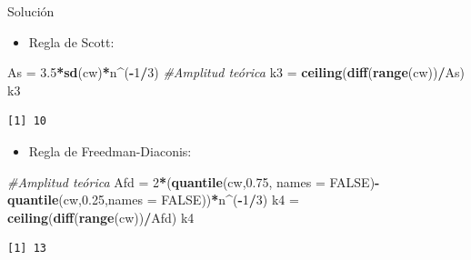 \documentclass[
  ignorenonframetext,
]{beamer}
\newenvironment{Shaded}{\begin{snugshade}}{\end{snugshade}}
\newcommand{\AttributeTok}[1]{\textcolor[rgb]{0.13,0.29,0.53}{#1}}
\newcommand{\CommentTok}[1]{\textcolor[rgb]{0.56,0.35,0.01}{\textit{#1}}}
\newcommand{\ConstantTok}[1]{\textcolor[rgb]{0.56,0.35,0.01}{#1}}
\newcommand{\DecValTok}[1]{\textcolor[rgb]{0.00,0.00,0.81}{#1}}
\newcommand{\FloatTok}[1]{\textcolor[rgb]{0.00,0.00,0.81}{#1}}
\newcommand{\FunctionTok}[1]{\textcolor[rgb]{0.13,0.29,0.53}{\textbf{#1}}}
\newcommand{\NormalTok}[1]{#1}
\newcommand{\OtherTok}[1]{\textcolor[rgb]{0.56,0.35,0.01}{#1}}
\newcommand{\SpecialCharTok}[1]{\textcolor[rgb]{0.81,0.36,0.00}{\textbf{#1}}}
\providecommand{\tightlist}{%
  \setlength{\itemsep}{0pt}\setlength{\parskip}{0pt}}
\begin{document}
\begin{frame}[fragile]{Solución}
\label{soluciuxf3n-2}
\begin{itemize}
\tightlist
\item
  Regla de Scott:
\end{itemize}

\begin{Shaded}
\begin{Highlighting}[]
\NormalTok{As }\OtherTok{=} \FloatTok{3.5}\SpecialCharTok{*}\FunctionTok{sd}\NormalTok{(cw)}\SpecialCharTok{*}\NormalTok{n}\SpecialCharTok{\^{}}\NormalTok{(}\SpecialCharTok{{-}}\DecValTok{1}\SpecialCharTok{/}\DecValTok{3}\NormalTok{) }\CommentTok{\#Amplitud teórica}
\NormalTok{k3 }\OtherTok{=} \FunctionTok{ceiling}\NormalTok{(}\FunctionTok{diff}\NormalTok{(}\FunctionTok{range}\NormalTok{(cw))}\SpecialCharTok{/}\NormalTok{As)}
\NormalTok{k3}
\end{Highlighting}
\end{Shaded}

\begin{verbatim}
[1] 10
\end{verbatim}

\begin{itemize}
\tightlist
\item
  Regla de Freedman-Diaconis:
\end{itemize}

\begin{Shaded}
\begin{Highlighting}[]
\CommentTok{\#Amplitud teórica}
\NormalTok{Afd }\OtherTok{=} \DecValTok{2}\SpecialCharTok{*}\NormalTok{(}\FunctionTok{quantile}\NormalTok{(cw,}\FloatTok{0.75}\NormalTok{, }\AttributeTok{names =} \ConstantTok{FALSE}\NormalTok{)}\SpecialCharTok{{-}}\FunctionTok{quantile}\NormalTok{(cw,}\FloatTok{0.25}\NormalTok{,}\AttributeTok{names =} \ConstantTok{FALSE}\NormalTok{))}\SpecialCharTok{*}\NormalTok{n}\SpecialCharTok{\^{}}\NormalTok{(}\SpecialCharTok{{-}}\DecValTok{1}\SpecialCharTok{/}\DecValTok{3}\NormalTok{) }
\NormalTok{k4 }\OtherTok{=} \FunctionTok{ceiling}\NormalTok{(}\FunctionTok{diff}\NormalTok{(}\FunctionTok{range}\NormalTok{(cw))}\SpecialCharTok{/}\NormalTok{Afd)}
\NormalTok{k4}
\end{Highlighting}
\end{Shaded}

\begin{verbatim}
[1] 13
\end{verbatim}
\end{frame}
\end{document}
